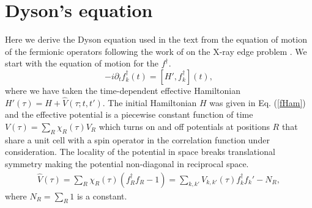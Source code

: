 \documentclass[aps,pra,preprint,groupedaddress]{revtex4-1}
\newcommand{\1}{\mathds{1}}
\begin{document}
\section{Dyson's equation} \label{app:Dyson}
Here we derive the Dyson equation used in the text from the equation of motion of the fermionic operators following the work of \cite{Langreth} on the X-ray edge problem \cite{Noz1}. We start with the equation of motion for the $f^\dagger$.
$$ -i \partial_t f^\dagger_k (t) = \left[H',f^\dagger_k \right](t), $$
where we have taken the time-dependent effective Hamiltonian $H'(\tau) = H +\hat{V}(\tau;t,t')$. The initial Hamiltonian $H$ was given in Eq. (\ref{fHam}) and the effective potential is a piecewise constant function of time $V(\tau)= \sum_{R} \chi_R(\tau) V_R$ which turns on and off potentials at positions $R$ that share a unit cell with a spin operator in the correlation function under consideration. The locality of the potential in space breaks translational symmetry making the potential non-diagonal in reciprocal space.  
\begin{align}
\hat{V}(\tau) = \sum_{R} \chi_R(\tau) (f^\dagger_R f_R-1) = \sum_{k,k'} V_{k,k'}(\tau) f^\dagger_k f_k' - N_R,
\end{align}
where $N_R = \sum_R 1$ is a constant. 
\end{document}
